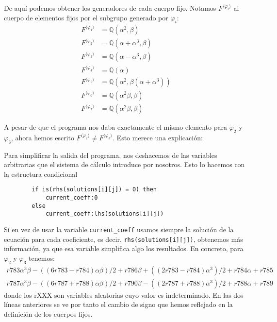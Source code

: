 \documentclass[a4paper, 11pt]{article}
\begin{document}
\begin{solucion}
      De aquí podemos obtener los generadores de cada cuerpo fijo. Notamos $F^{\langle\varphi_i\rangle}$ al cuerpo de elementos fijos por el subgrupo generado por $\varphi_i$:
      \begin{align*}
          F^{\langle\varphi_1\rangle} &= \mathbb{Q}(\alpha^2,\beta) \\
          F^{\langle\varphi_2\rangle} &= \mathbb{Q}(\alpha+\alpha^3,\beta) \\
          F^{\langle\varphi_3\rangle} &= \mathbb{Q}(\alpha-\alpha^3,\beta) \\
          F^{\langle\varphi_4\rangle} &= \mathbb{Q}(\alpha) \\
          F^{\langle\varphi_5\rangle} &= \mathbb{Q}(\alpha^2,\beta(\alpha+\alpha^3)) \\
          F^{\langle\varphi_6\rangle} &= \mathbb{Q}(\alpha^2\beta,\beta) \\
          F^{\langle\varphi_7\rangle} &= \mathbb{Q}(\alpha^2\beta,\beta)
      \end{align*}

      A pesar de que el programa nos daba exactamente el mismo elemento para $\varphi_2$ y $\varphi_3$, ahora hemos escrito $F^{\langle\varphi_2\rangle} \neq F^{\langle\varphi_3\rangle}$. Esto merece una explicación:

      Para simplificar la salida del programa, nos deshacemos de las variables arbitrarias que el sistema de cálculo introduce por nosotros. Esto lo hacemos con la estructura condicional
      \color{blue}
      \begin{verbatim}
        if is(rhs(solutions[i][j]) = 0) then
            current_coeff:0
        else
            current_coeff:lhs(solutions[i][j])
      \end{verbatim}
      \color{black}

      Si en vez de usar la variable \texttt{current\_coeff} usamos siempre la solución de la ecuación para cada coeficiente, es decir, \texttt{rhs(solutions[i][j])}, obtenemos más información, ya que esa variable simplifica algo los resultados. En concreto, para $\varphi_2$ y $\varphi_3$ tenemos:
      \color{blue}
      \begin{align*}
          r783\alpha^3\beta-((6r783-r784)\alpha\beta)/2+r786\beta+((2r783-r784)\alpha^3)/2+r784\alpha+r785 \\
          r787\alpha^3\beta-((6r787+r788)\alpha\beta)/2+r790\beta-((2r787+r788)\alpha^3)/2+r788\alpha+r789
      \end{align*}
      \color{black}
      donde los rXXX son variables aleatorias cuyo valor es indeterminado. En las dos líneas anteriores se ve por tanto el cambio de signo que hemos reflejado en la definición de los cuerpos fijos.


\end{solucion}
\end{document}
